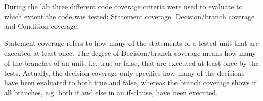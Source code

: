 During the lab three different code coverage criteria were used to evaluate to which extent the code was tested; Statement coverage, Decision/branch coverage and Condition coverage. 

Statement coverage refers to how many of the statements of a tested unit that are executed at least once. The degree of Decision/branch coverage means how many of the branches of an unit, i.e. true or false, that are executed at least once by the tests. Actually, the decision coverage only specifies how many of the decisions have been evaluated to both true and false, whereas the branch coverage shows if all branches, e.g. both if and else in an if-clause, have been executed. 

